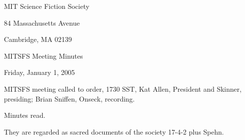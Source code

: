 \documentclass[10pt]{article}
\newcommand{\ps}{ plus Spehn\xspace}
\begin{document}
\begin{center}

MIT Science Fiction Society

84 Massachusetts Avenue

Cambridge, MA 02139

\vspace{12pt}

MITSFS Meeting Minutes

Friday, January 1, 2005

\end{center}

\vspace{18pt}

\setlength{\parskip}{6pt}

\noindent
MITSFS meeting called to order, 1730 SST, Kat Allen, President and
Skinner, presiding; Brian Sniffen,  Onseck, recording.

Minutes read.

They are regarded as sacred documents of the society 17-4-2\ps.
\end{document}
